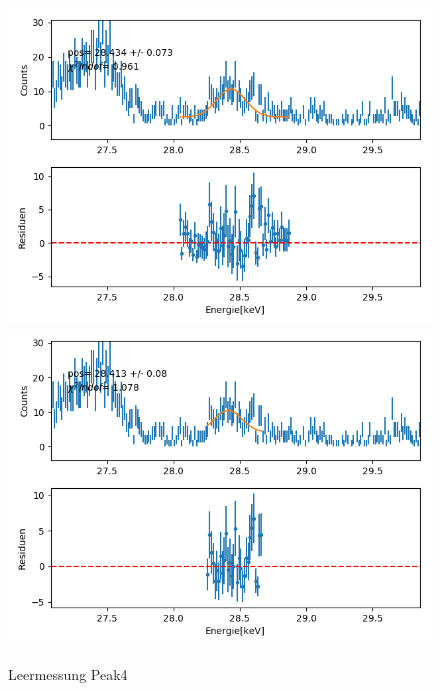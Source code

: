 \documentclass[12pt,a4paper]{article}
\begin{document}
\begin{figure}[H]
\centering
\includegraphics[scale=0.49]{Bilder/alpha_spektren/leer_4_1.png}
\includegraphics[scale=0.49]{Bilder/alpha_spektren/leer_4_2.png}
\caption{Leermessung Peak4}
\end{figure}
\end{document}

